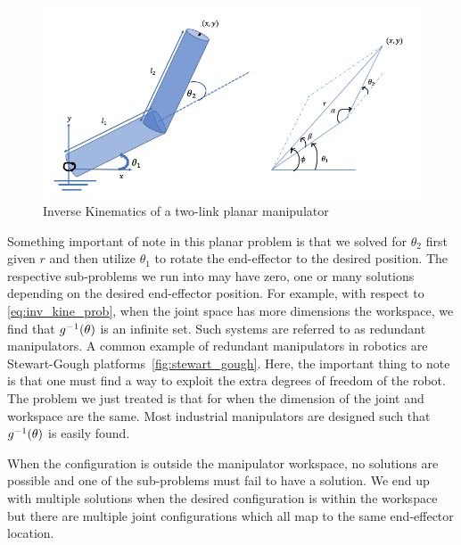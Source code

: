 \begin{figure}[tb!]
	\centering
	\includegraphics[width=.8\columnwidth]{figures/ik_ex.png}
	\caption{Inverse Kinematics of a two-link planar manipulator}
	\label{fig:ik_ex}
\end{figure}
%
Something important of note in this planar problem is that we solved for $\theta_2$ first given $r$ and then utilize $\theta_1$ to rotate the end-effector to the desired position. The respective sub-problems we run into may have zero, one or many solutions depending on the desired end-effector position. For example, with respect to \eqref{eq:inv_kine_prob}, when the joint space has more dimensions the workspace, we find that $g^{-1}(\theta)$  is an infinite set. Such systems are referred to as redundant manipulators. A common example of redundant manipulators in robotics are Stewart-Gough platforms~\autoref{fig:stewart_gough}.  Here, the important thing to note is that one must find a way to exploit the extra degrees of freedom of the robot. The problem we just treated is that for when the dimension of the joint and workspace are the same. Most industrial manipulators are designed such that $g^{-1}(\theta)$ is easily found. 

When the configuration is outside the manipulator workspace, no solutions are possible and one of the sub-problems must fail to have a solution. We end up with multiple solutions when the desired configuration is within the workspace but there are multiple joint configurations which all map to the same end-effector location.
